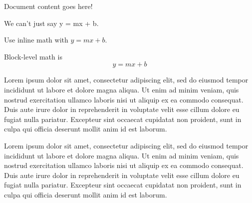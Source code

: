 \documentclass{article}
\begin{document}
Document content goes here!

We can't just say y = mx + b.

Use inline math with $y = mx + b$.

Block-level math is $$y = mx + b$$

Lorem ipsum dolor sit amet, consectetur adipiscing elit, sed do eiusmod tempor incididunt ut labore et dolore magna aliqua. Ut enim ad minim veniam, quis nostrud exercitation ullamco laboris nisi ut aliquip ex ea commodo consequat. Duis aute irure dolor in reprehenderit in voluptate velit esse cillum dolore eu fugiat nulla pariatur. Excepteur sint occaecat cupidatat non proident, sunt in culpa qui officia deserunt mollit anim id est laborum.

Lorem ipsum dolor sit amet, consectetur adipiscing elit, sed do eiusmod tempor incididunt ut labore et dolore magna aliqua. Ut enim ad minim veniam, quis nostrud exercitation ullamco laboris nisi ut aliquip ex ea commodo consequat. 
Duis aute irure dolor in reprehenderit in voluptate velit esse cillum dolore eu fugiat nulla pariatur. Excepteur sint occaecat cupidatat non proident, sunt in culpa qui officia deserunt mollit anim id est laborum.
\end{document}
